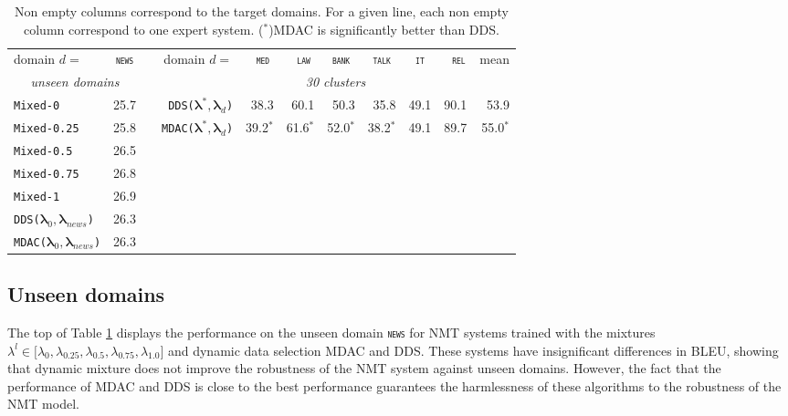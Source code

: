 \documentclass[11pt]{article}
\newcommand{\domain}[1]{\texttt{\textsc{#1}}}
\newcommand{\system}[1]{\texttt{{#1}}}
\newcommand{\vlambda}{\ensuremath{\boldsymbol\lambda}\xspace} %
\begin{document}
\begin{table}[htbp]
  \centering \small
  \begin{tabular}{|l|*{10}{r|}} \cline{1-2} \cline{4-11}
    domain \hfill $d=$ & \multicolumn{1}{c|}{\domain{news}}& \hfill &domain \hfill $d=$ & \multicolumn{1}{c|}{\domain{ med}} & \multicolumn{1}{c|}{\domain{ law}} & \multicolumn{1}{c|}{\domain{bank}} & \multicolumn{1}{c|}{\domain{talk}} & \multicolumn{1}{c|}{\domain{ it }} & \multicolumn{1}{c|}{\domain{ rel}} & \multicolumn{1}{c|}{mean}  \\ 
\cline{1-2} \cline{4-11}
    \multicolumn{2}{|c|}{\sl unseen domains} & &\multicolumn{8}{c|}{\sl 30 clusters} \\ 
\cline{1-2} \cline{4-11}
    \system{Mixed-0}      & 25.7 & &\system{DDS($\vlambda^*, \vlambda_d$)}&38.3&60.1&50.3&35.8&49.1&90.1&53.9\\
    \system{Mixed-0.25} & 25.8 & &\system{MDAC($\vlambda^*, \vlambda_d$)}&39.2$^*$&61.6$^*$&52.0$^*$&38.2$^*$&49.1&89.7&55.0$^*$\\ \cline{4-11}
    \system{Mixed-0.5}   &26.5\\
    \system{Mixed-0.75} &26.8\\
    \system{Mixed-1} &26.9 \\
    \cline{1-2}
     \system{DDS($\vlambda_0, \vlambda_{news}$)} &26.3 \\
     \system{MDAC($\vlambda_0, \vlambda_{news}$)} &26.3 \\
     \cline{1-2}
  \end{tabular}
  \caption{Non empty columns correspond to the target domains. For a given line, each non empty column correspond to one expert system. ($^*$)MDAC is significantly better than DDS.}
  \label{tab:unsupervised-da}
\end{table}

\subsection{Unseen domains}\label{ssec:uda}
The top of Table \ref{tab:unsupervised-da} displays the performance on the unseen domain \domain{news} for NMT systems trained with the mixtures $\lambda^l \in \big[ \lambda_0, \lambda_{0.25}, \lambda_{0.5}, \lambda_{0.75}, \lambda_{1.0}\big]$ and dynamic data selection MDAC and DDS. These systems have insignificant differences in BLEU, showing that dynamic mixture does not improve the robustness of the NMT system against unseen domains. However, the fact that the performance of MDAC and DDS is close to the best performance guarantees the harmlessness of these algorithms to the robustness of the NMT model.
\end{document}
